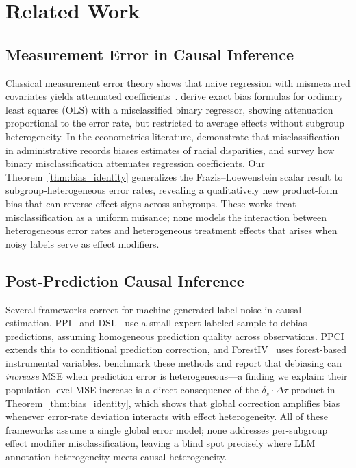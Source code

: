 \section{Related Work}
\label{sec:related}

\subsection{Measurement Error in Causal Inference}

Classical measurement error theory shows that naive regression with mismeasured covariates yields attenuated coefficients~\cite{fuller1987measurement,carroll2006measurement}.
\citet{frazis2003estimating} derive exact bias formulas for ordinary least squares (OLS) with a misclassified binary regressor, showing attenuation proportional to the error rate, but restricted to average effects without subgroup heterogeneity.
In the econometrics literature, \citet{knox2020administrative} demonstrate that misclassification in administrative records biases estimates of racial disparities, and \citet{bound2001measurement} survey how binary misclassification attenuates regression coefficients.
Our Theorem~\ref{thm:bias_identity} generalizes the Frazis--Loewenstein scalar result to subgroup-heterogeneous error rates, revealing a qualitatively new product-form bias that can reverse effect signs across subgroups.
These works treat misclassification as a uniform nuisance; none models the interaction between heterogeneous error rates and heterogeneous treatment effects that arises when noisy labels serve as effect modifiers.

\subsection{Post-Prediction Causal Inference}

Several frameworks correct for machine-generated label noise in causal estimation.
PPI~\cite{angelopoulos2023ppi} and DSL~\cite{egami2023dsl} use a small expert-labeled sample to debias predictions, assuming homogeneous prediction quality across observations.
PPCI~\cite{sui2026ppci} extends this to conditional prediction correction, and ForestIV~\cite{bu2023forestiv} uses forest-based instrumental variables.
\citet{audinet2025benchmarking} benchmark these methods and report that debiasing can \emph{increase} MSE when prediction error is heterogeneous---a finding we explain: their population-level MSE increase is a direct consequence of the $\delta_s \cdot \Delta\tau$ product in Theorem~\ref{thm:bias_identity}, which shows that global correction amplifies bias whenever error-rate deviation interacts with effect heterogeneity.
All of these frameworks assume a single global error model; none addresses per-subgroup effect modifier misclassification, leaving a blind spot precisely where LLM annotation heterogeneity meets causal heterogeneity.

